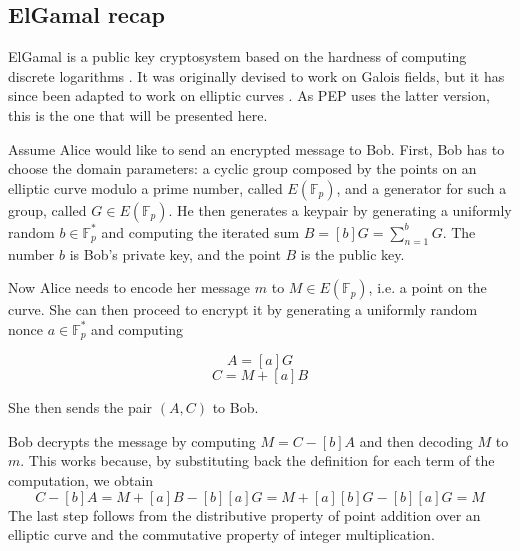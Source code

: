 \documentclass{report}
\begin{document}
\subsection{ElGamal recap}\label{elgamal_recap}
ElGamal is a public key cryptosystem based on the hardness of computing discrete logarithms \cite{elgamal}. It was originally devised to work on Galois fields, but it has since
been adapted to work on elliptic curves \cite{elliptic-elgamal}. As PEP uses the latter version, this is the one that will be presented here.\par
Assume Alice would like to send an encrypted message to Bob. First, Bob has to choose the domain parameters: a cyclic group composed by the points on an elliptic curve modulo a
prime number, called $E(\mathds{F}_p)$, and a generator for such a group, called $G \in E(\mathds{F}_p)$. He then generates a keypair by generating a uniformly random $b \in
\mathds{F}^*_p$ and computing the iterated sum $B=[b]G=\sum_{n=1}^b G$. The number $b$ is Bob's private key, and the point $B$ is the public key.\par
Now Alice needs to encode her message $m$ to $M \in E(\mathds{F}_p)$, i.e. a point on the curve. She can then proceed to encrypt it by generating a uniformly random nonce $a \in
\mathds{F}^*_p$ and computing

$$A=[a]G$$
$$C=M+[a]B$$

\noindent
She then sends the pair $(A, C)$ to Bob. \newline
\par
Bob decrypts the message by computing $M=C-[b]A$ and then decoding $M$ to $m$. This works because, by substituting back the definition for each term of the computation, we obtain
		$$C-[b]A=M+[a]B-[b][a]G=M+[a][b]G-[b][a]G=M$$ 
		The last step follows from the distributive property of point addition over an elliptic curve and the commutative property of integer multiplication.
\end{document}
